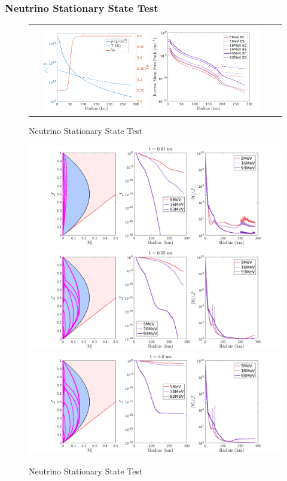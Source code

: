 \subsubsection{Neutrino Stationary State Test}
\begin{figure}[h]
  \centering
  \begin{tabular}{cc}
    \includegraphics[width=0.45\textwidth]{figures/NStatinaryS_EOS}
    \includegraphics[width=0.45\textwidth]{figures/NSS_Opacities}
  \end{tabular}
   \caption{Neutrino Stationary State Test}
\end{figure}

\begin{figure}[h]
  \centering
    \includegraphics[width=\textwidth]{figures/NSS_1_1}\\
    \includegraphics[width=\textwidth]{figures/NSS_3_1} \\
    \includegraphics[width=\textwidth]{figures/NSS_5_1} \\
   \caption{Neutrino Stationary State Test}
\end{figure}